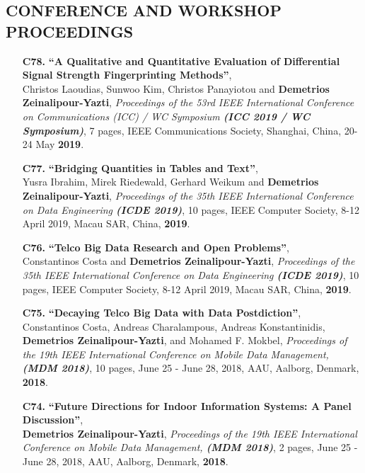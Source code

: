 \documentclass[10pt]{article}
\begin{document}
\subsection*{CONFERENCE AND WORKSHOP PROCEEDINGS}
\begin{enumerate}


\item[{\bf C78.}]
\label{C78} %
{\bf ``A Qualitative and Quantitative Evaluation of Differential Signal Strength Fingerprinting Methods''}, \\
Christos Laoudias, Sunwoo Kim, Christos Panayiotou and {\bf Demetrios Zeinalipour-Yazti},
{\em Proceedings of the 53rd IEEE International Conference on Communications (ICC) / WC Symposium {\bf (ICC 2019 / WC Symposium)}}, 7 pages, IEEE Communications Society, Shanghai, China, 20-24 May {\bf 2019}.

\item[{\bf C77.}]
\label{C77} %
{\bf ``Bridging Quantities in Tables and Text''}, \\
Yusra Ibrahim, Mirek Riedewald, Gerhard Weikum and {\bf Demetrios Zeinalipour-Yazti},
{\em Proceedings of the 35th IEEE International Conference on Data Engineering {\bf (ICDE 2019)}}, 10 pages, IEEE Computer Society, 8-12 April 2019, Macau SAR, China, {\bf 2019}.

\item[{\bf C76.}]
\label{C76} %
{\bf ``Telco Big Data Research and Open Problems''}, \\
Constantinos Costa and {\bf Demetrios Zeinalipour-Yazti},
{\em Proceedings of the 35th IEEE International Conference on Data Engineering {\bf (ICDE 2019)}}, 10 pages, IEEE Computer Society, 8-12 April 2019, Macau SAR, China, {\bf 2019}.

\item[{\bf C75.}]
\label{C75} %
{\bf ``Decaying Telco Big Data with Data Postdiction''}, \\
Constantinos Costa, Andreas Charalampous, Andreas Konstantinidis, {\bf Demetrios Zeinalipour-Yazti}, and Mohamed F. Mokbel,
{\em Proceedings of the 19th IEEE International Conference on Mobile Data Management, {\bf (MDM 2018)}}, 10 pages, June 25 - June 28, 2018, AAU, Aalborg, Denmark, {\bf 2018}.

\item[{\bf C74.}]
\label{C74} %
{\bf ``Future Directions for Indoor Information Systems: A Panel Discussion''}, \\
{\bf Demetrios Zeinalipour-Yazti},
{\em Proceedings of the 19th IEEE International Conference on Mobile Data Management, {\bf (MDM 2018)}}, 2 pages, June 25 - June 28, 2018, AAU, Aalborg, Denmark, {\bf 2018}.


\end{enumerate}
\end{document}
